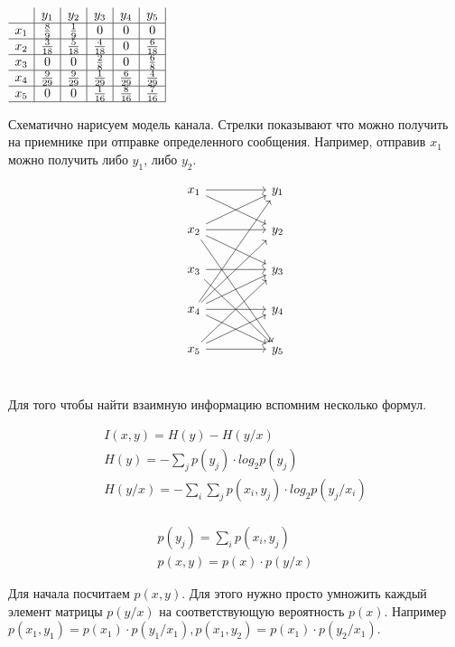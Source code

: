 \documentclass[a4paper,12pt]{article}
\begin{document}
\begin{table}[h]
$\begin{array}{c *{5}{|c} |}
& y_1 & y_2 & y_3 & y_4 & y_5 \\ \hline
x_1 & \frac{8}{9} & \frac{1}{9} & 0 & 0 & 0 \\ \hline
x_2 & \frac{3}{18} & \frac{5}{18} & \frac{4}{18} & 0 & \frac{6}{18} \\ \hline
x_3 & 0 & 0 & \frac{2}{8} & 0 & \frac{6}{8} \\ \hline
x_4 & \frac{9}{29} & \frac{9}{29} & \frac{1}{29} & \frac{6}{29} & \frac{4}{29} \\ \hline
x_5 & 0 & 0 & \frac{1}{16} & \frac{8}{16} & \frac{7}{16} \\ \hline
\end{array}$
\caption{$p(y / x)$}
\end{table}

Схематично нарисуем модель канала.
Стрелки показывают что можно получить на приемнике при отправке определенного сообщения.
Например, отправив $x_1$ можно получить либо $y_1$, либо $y_2$.

$$
\begin{tikzcd}
x_1 \arrow[rr] \arrow[drr] && y_1 \\
x_2 \arrow[urr] \arrow[rr] \arrow[drr] \arrow[dddrr] && y_2\\
x_3 \arrow[rr] \arrow[ddrr] && y_3 \\
x_4 \arrow[uuurr] \arrow[uurr] \arrow[urr] \arrow[rr] \arrow[drr] && y_4 \\
x_5 \arrow[uurr] \arrow[urr] \arrow[rr] && y_5 \\
\end{tikzcd}
$$

Для того чтобы найти взаимную информацию вспомним несколько формул.

\begin{gather*}
I(x, y) = H(y) - H(y / x) \\
H(y) = - \sum_{j} p(y_j) \cdot log_2 p(y_j) \\
H(y / x) = - \sum_{i} \sum_{j} p(x_i, y_j) \cdot log_2 p(y_j / x_i) \\
\end{gather*}

\begin{gather*}
p(y_j) = \sum_{i} p(x_i, y_j) \\
p(x, y) = p(x) \cdot p(y / x)
\end{gather*}

Для начала посчитаем $p(x, y)$.
Для этого нужно просто умножить каждый элемент матрицы $p(y / x)$ на соответствующую вероятность $p(x)$.
Например $p(x_1, y_1) = p(x_1) \cdot p(y_1 / x_1), p(x_1, y_2) = p(x_1) \cdot p(y_2 / x_1)$.
\end{document}
